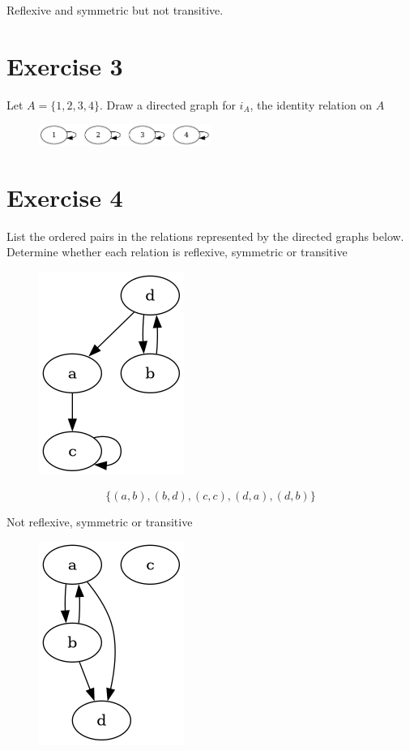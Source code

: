 \documentclass[11pt]{article}
\begin{document}
Reflexive and symmetric but not transitive.

\section*{Exercise 3}

Let $A = \{1, 2, 3, 4\}$. Draw a directed graph for $i_A$, the identity relation 
on $A$

\begin{figure}[H]
\includegraphics[width=0.5\textwidth]{4_3_images/4_3_3.png}
\end{figure}

\section*{Exercise 4}

List the ordered pairs in the relations represented by the directed graphs below.
Determine whether each relation is reflexive, symmetric or transitive

\begin{figure}[H]
\includegraphics[height=0.25\textheight]{4_3_images/4_3_4a.png}
\end{figure}

$$\{ (a, b), (b, d), (c, c), (d, a), (d,b) \}$$

Not reflexive, symmetric or transitive

\begin{figure}[H]
\includegraphics[height=0.25\textheight]{4_3_images/4_3_4b.png}
\end{figure}
\end{document}
